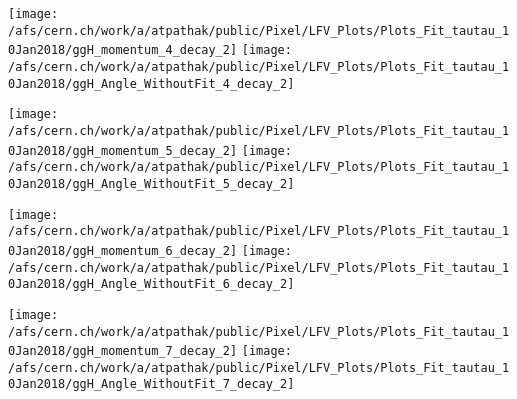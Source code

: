 \documentclass{beamer}
\begin{document}
\begin{frame}
\begin{normalsize}
\begin{center}
\texttt{[image: /afs/cern.ch/work/a/atpathak/public/Pixel/LFV\_Plots/Plots\_Fit\_tautau\_10Jan2018/ggH\_momentum\_4\_decay\_2]}
\texttt{[image: /afs/cern.ch/work/a/atpathak/public/Pixel/LFV\_Plots/Plots\_Fit\_tautau\_10Jan2018/ggH\_Angle\_WithoutFit\_4\_decay\_2]} 
\end{center}
\end{normalsize}
\end {frame}
\begin{frame}
\begin{normalsize}
\begin{center}
\texttt{[image: /afs/cern.ch/work/a/atpathak/public/Pixel/LFV\_Plots/Plots\_Fit\_tautau\_10Jan2018/ggH\_momentum\_5\_decay\_2]}
\texttt{[image: /afs/cern.ch/work/a/atpathak/public/Pixel/LFV\_Plots/Plots\_Fit\_tautau\_10Jan2018/ggH\_Angle\_WithoutFit\_5\_decay\_2]} 
\end{center}
\end{normalsize}
\end {frame}
\begin{frame}
\begin{normalsize}
\begin{center}
\texttt{[image: /afs/cern.ch/work/a/atpathak/public/Pixel/LFV\_Plots/Plots\_Fit\_tautau\_10Jan2018/ggH\_momentum\_6\_decay\_2]}
\texttt{[image: /afs/cern.ch/work/a/atpathak/public/Pixel/LFV\_Plots/Plots\_Fit\_tautau\_10Jan2018/ggH\_Angle\_WithoutFit\_6\_decay\_2]} 
\end{center}
\end{normalsize}
\end {frame}
\begin{frame}
\begin{normalsize}
\begin{center}
\texttt{[image: /afs/cern.ch/work/a/atpathak/public/Pixel/LFV\_Plots/Plots\_Fit\_tautau\_10Jan2018/ggH\_momentum\_7\_decay\_2]}
\texttt{[image: /afs/cern.ch/work/a/atpathak/public/Pixel/LFV\_Plots/Plots\_Fit\_tautau\_10Jan2018/ggH\_Angle\_WithoutFit\_7\_decay\_2]} 
\end{center}
\end{normalsize}
\end {frame}
\end{document}
